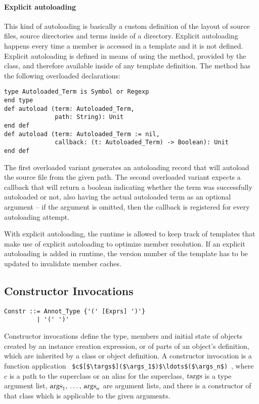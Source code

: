 \paragraph{Explicit autoloading}
This kind of autoloading is basically a custom definition of the layout of source files, source directories and terms inside of a directory. Explicit autoloading happens every time a member is accessed in a template and it is not defined. Explicit autoloading is defined in means of using the  method, provided by the  class, and therefore available inside of any template definition. The method has the following overloaded declarations: 
\begin{lstlisting}
type Autoloaded_Term is Symbol or Regexp 
end type
def autoload (term: Autoloaded_Term, 
              path: String): Unit
end def
def autoload (term: Autoloaded_Term := nil, 
              callback: (t: Autoloaded_Term) -> Boolean): Unit
end def
\end{lstlisting}
The first overloaded variant generates an autoloading record that will autoload the source file from the given path. The second overloaded variant expects a callback that will return a boolean indicating whether the term was successfully autoloaded or not, also having the actual autoloaded term as an optional argument -- if the argument is omitted, then the callback is registered for every autoloading attempt.

With explicit autoloading, the runtime is allowed to keep track of templates that make use of explicit autoloading to optimize member resolution. If an explicit autoloading is added in runtime, the version number of the template has to be updated to invalidate member caches. 







\subsection{Constructor Invocations}
\label{sec:constructor-invocations}

\syntax\begin{lstlisting}
Constr ::= Annot_Type {'(' [Exprs] ')'}
         | '(' ')'
\end{lstlisting}

Constructor invocations define the type, members and initial state of objects created by an instance creation expression, or of parts of an object's definition, which are inherited by a class or object definition. A constructor invocation is a function application ~\lstinline!$c$[$\targs$]($\args_1$)$\ldots$($\args_n$)!~, where $c$ is a path to the superclass or an alias for the superclass, $\mbox{\sl targs}$ is a type argument list, $\mbox{\sl args}_1 ,\, \ldots ,\, \mbox{\sl args}_n$ are argument lists, and there is a constructor of that class which is applicable to the given arguments. 

